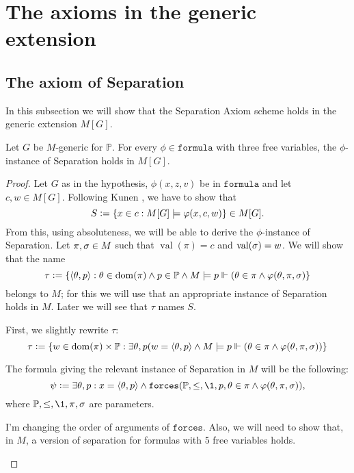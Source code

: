 \documentclass[11pt,english]{article}
\renewcommand{\PP}{\mathbb{P}}
\newcommand{\formula}{\ensuremath{\mathtt{formula}}}
\newcommand{\forceisa}{\mathtt{forces}}
\DeclareMathOperator{\val}{val}
\begin{document}
\section{The axioms in the generic extension}
\subsection{The axiom of Separation}
In this subsection we will show that the Separation Axiom scheme holds
in the generic extension $M[G]$. 

\begin{lemma}
  Let $G$ be $M$-generic for $\PP$. For every $\phi\in\formula$ with
  three free variables, the $\phi$-instance of Separation holds in
  $M[G]$.
\end{lemma}
\begin{proof}
  Let $G$ as in the hypothesis, $\phi(x,z,v)$ be in \formula{} and let
  $c,w\in M[G]$. Following Kunen \cite[Lemma IV.2.6]{kunen2011set},
  we have to show that 
  \[
  S\mathrel{\mathop:}=\{x\in c : M[G]\models \varphi(x,c,w)\} \in M[G].
  \]
  From this, using absoluteness, we will be able to derive the
  $\phi$-instance of Separation. Let $\pi,\sigma\in M$ such that 
  $\val(\pi)=c$ and $\val(\sig)=w$.
  We will show that the name
  \[
  \tau \defi \{\lb\th,p\rb: \th\in\dom(\pi) \y p\in \PP\y
  M\models p\forces(\th\in\pi\y\phi(\th,\pi,\sig)\}
  \]
  belongs to $M$; for this we will use that an appropriate instance of
  Separation holds in $M$. Later we will see that $\tau$ names $S$.
  
  First, we slightly rewrite $\tau$:
  \[
  \tau \defi \{w\in\dom(\pi)\times\PP :\exists \th,p (w=\lb\th,p\rb \y 
  M\models p \forces(\th\in\pi\y\phi(\th,\pi,\sig))\}
  \]
  
  The formula giving the relevant instance of Separation in $M$ will be the
  following:
  \[
  \psi \defi \exists \th,p : x=\lb\th,p\rb \y \forceisa(\PP,\leq,\1,p,\th\in\pi\y\phi(\th,\pi,\sig)),
  \]
  where $\PP,\leq,\1,\pi,\sig$ are parameters.
  \begin{framed}
    I'm changing the order of arguments of $\forceisa$. Also, we
    will need to show that, in $M$, a version of separation for formulas
    with  $5$ free variables holds.


\end{framed}
\end{proof}
\end{document}
